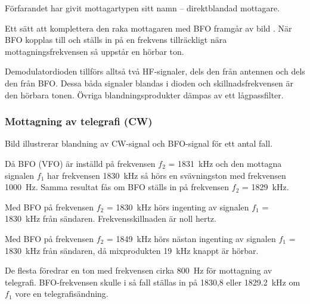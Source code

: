 Förfarandet har givit mottagartypen sitt namn -- direktblandad mottagare.

Ett sätt att komplettera den raka mottagaren med BFO framgår av bild
.
När BFO kopplas till och ställs in på en frekvens tillräckligt
nära mottagningsfrekvensen så uppstår en hörbar ton.

Demodulatordioden tillförs alltså två HF-signaler, dels den från antennen och
dels den från BFO.
Dessa båda signaler blandas i dioden och skillnadsfrekvensen är den hörbara
tonen.
Övriga blandningsprodukter dämpas av ett lågpassfilter.



\newpage
\subsubsection{Mottagning av telegrafi (CW)}

Bild  illustrerar blandning av CW-signal och BFO-signal
för ett antal fall.

Då BFO (VFO) är inställd på frekvensen \(f_2\) = \qty{1831}{\kilo\hertz} och den
mottagna signalen \(f_1\) har frekvensen \qty{1830}{\kilo\hertz} så hörs en
svävningston med frekvensen \qty{1000}{\hertz}.
Samma resultat fås om BFO ställs in på frekvensen \(f_2\) =
\qty{1829}{\kilo\hertz}.

Med BFO på frekvensen \(f_2\) = \qty{1830}{\kilo\hertz} hörs ingenting av
signalen \(f_1\) = \qty{1830}{\kilo\hertz} från sändaren.
Frekvensskillnaden är noll hertz.

Med BFO på frekvensen \(f_2\) = \qty{1849}{\kilo\hertz} hörs nästan ingenting av
signalen \(f_1\) = \qty{1830}{\kilo\hertz} från sändaren, då mixprodukten
\qty{19}{\kilo\hertz} knappt är hörbar.

De flesta föredrar en ton med frekvensen cirka \qty{800}{\hertz} för mottagning
av telegrafi.
BFO-frekvensen skulle i så fall ställas in på 1830,8 eller
\qty{1829,2}{\kilo\hertz} om \(f_1\) vore en telegrafisändning.


